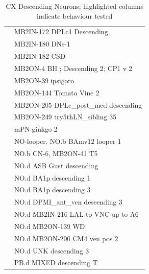 \begin{table}
{\begin{tabular}{p{}|p{}}
            & \cellcolor{cxhl} MB2IN-172 DPLc1 Descending \\
            & MB2IN-180 DNs-1 \\
            & MB2IN-182 CSD \\
            & MB2ON-4 BH ; Descending 2; CP1 v 2 \\
            & \cellcolor{cxhl} MB2ON-39 ipsigoro \\
            & MB2ON-144 Tomato Vine 2 \\
            & MB2ON-205 DPLc\_post\_med descending \\
            & MB2ON-249 try5thLN\_sibling 35 \\
            & mPN ginkgo 2 \\
            & NO-looper, NO.b BAmv12 looper 1 \\
            & NO.b CN-6, MB2ON-41 T5 \\
            & NO.d ASB Gust descending \\
            & NO.d BA1p descending 1 \\
            & NO.d BA1p descending 3 \\
            & \cellcolor{cxhl} NO.d DPMI\_ant\_ven descending 3 \\
            & NO.d MB2IN-216 LAL to VNC up to A6 \\
            & NO.d MB2ON-139 WD \\
            & NO.d MB2ON-200 CM4 ven pos 2 \\
            & NO.d UNK descending 3 \\
            & PB.d MIXED descending T \\
            \bottomrule
        \end{tabular}%
        }
        \caption[CX Descending Neurons]{CX Descending Neurons; highlighted columns indicate behaviour tested}
        \label{CXDescending}
    \end{table}




